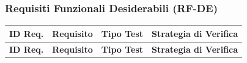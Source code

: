 \documentclass[a4paper,11pt,oneside]{scrartcl}
\begin{document}
\newpage
\subsubsection{Requisiti Funzionali Desiderabili (RF-DE)}

\begin{longtable}{|p{1.5cm}|p{5.5cm}|p{1.8cm}|p{5cm}|}
    \hline
    \textbf{ID Req.} & \textbf{Requisito}                                                                                                                      & \textbf{Tipo Test} & \textbf{Strategia di Verifica}                                                                                                                       \\
    \hline
    \endfirsthead
    \hline
    \textbf{ID Req.} & \textbf{Requisito}                                                                                                                      & \textbf{Tipo Test} & \textbf{Strategia di Verifica}                                                                                                                       \\
    \hline
    \endhead


\end{longtable}
\end{document}
